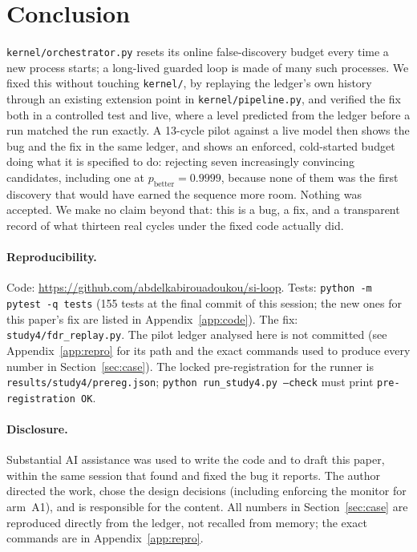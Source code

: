 \documentclass[11pt]{article}
\newcommand{\repo}{\url{https://github.com/abdelkabirouadoukou/si-loop}}
\begin{document}
\section{Conclusion}

\texttt{kernel/orchestrator.py} resets its online false-discovery budget every time a new process starts; a long-lived guarded loop is made of many such processes. We fixed this without touching \texttt{kernel/}, by replaying the ledger's own history through an existing extension point in \texttt{kernel/pipeline.py}, and verified the fix both in a controlled test and live, where a level predicted from the ledger before a run matched the run exactly. A 13-cycle pilot against a live model then shows the bug and the fix in the same ledger, and shows an enforced, cold-started budget doing what it is specified to do: rejecting seven increasingly convincing candidates, including one at $p_\text{better}=0.9999$, because none of them was the first discovery that would have earned the sequence more room. Nothing was accepted. We make no claim beyond that: this is a bug, a fix, and a transparent record of what thirteen real cycles under the fixed code actually did.

\paragraph{Reproducibility.} Code: \repo. Tests: \texttt{python -m pytest -q tests} (155 tests at the final commit of this session; the new ones for this paper's fix are listed in Appendix~\ref{app:code}). The fix: \texttt{study4/fdr\_replay.py}. The pilot ledger analysed here is not committed (see Appendix~\ref{app:repro} for its path and the exact commands used to produce every number in Section~\ref{sec:case}). The locked pre-registration for the runner is \texttt{results/study4/prereg.json}; \texttt{python run\_study4.py --check} must print \texttt{pre-registration OK}.

\paragraph{Disclosure.} Substantial AI assistance was used to write the code and to draft this paper, within the same session that found and fixed the bug it reports. The author directed the work, chose the design decisions (including enforcing the monitor for arm~A1), and is responsible for the content. All numbers in Section~\ref{sec:case} are reproduced directly from the ledger, not recalled from memory; the exact commands are in Appendix~\ref{app:repro}.
\end{document}
